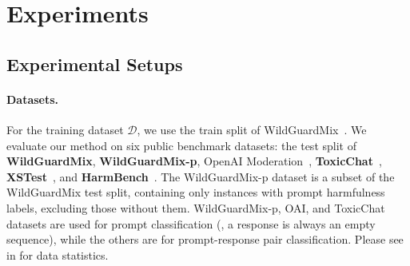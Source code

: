 \section{Experiments}


\subsection{Experimental Setups}
\label{sec:exp}
\paragraph{Datasets.} For the training dataset $\mathcal{D}$, we use the train split of WildGuardMix~\citep{wildguard}. We evaluate our method on six public benchmark datasets: the test split of \textbf{WildGuardMix}, \textbf{WildGuardMix-p}, 
OpenAI Moderation~\citep[\textbf{OAI};][]{oai-ds}, \textbf{ToxicChat}~\citep{toxic-chat}, \textbf{XSTest}~\cite{xstest}, and \textbf{HarmBench}~\citep{harmbench}. The WildGuardMix-p dataset is a subset of the WildGuardMix test split, containing only instances with prompt harmfulness labels, excluding those without them.
WildGuardMix-p, OAI, and ToxicChat datasets are used for prompt classification (\ie, a response is always an empty sequence), while the others are for prompt-response pair classification. Please see  in  for data statistics.


